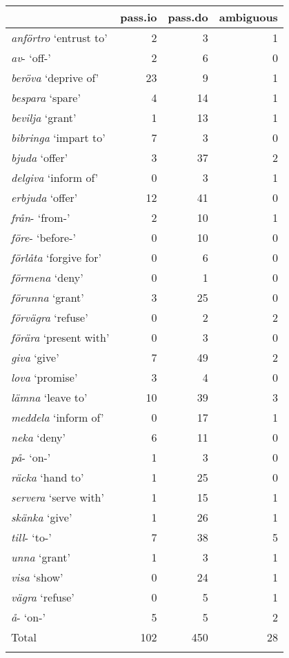 \documentclass[output=paper]{langscibook}
\begin{document}
\label{falk:appendix:3}
\begin{table}[H]
\begin{tabular}{l rrr}
\lsptoprule
& pass.io & pass.do & ambiguous\\\midrule
\textit{anförtro} ‘entrust to’ &  2 & 3  & 1\\
\textit{av}{}- ‘off-’          &  2 & 6  & 0\\
\textit{beröva} ‘deprive of’   & 23 & 9  & 1\\
\textit{bespara} ‘spare’       &  4 & 14 & 1\\
\textit{bevilja} ‘grant’       &  1 & 13 & 1\\
\textit{bibringa} ‘impart to’  &  7 & 3  & 0\\
\textit{bjuda} ‘offer’         &  3 & 37 & 2\\
\textit{delgiva} ‘inform of’   &  0 &  3 & 1\\
\textit{erbjuda} ‘offer’       & 12 & 41 & 0\\
\textit{från}{}- ‘from-’       &  2 & 10 & 1\\
\textit{före}{}- ‘before-’     &  0 & 10 & 0\\
\textit{förlåta} ‘forgive for’ &  0 &  6 & 0\\
\textit{förmena} ‘deny’        &  0 &  1 & 0\\
\textit{förunna} ‘grant’       &  3 & 25 & 0\\
\textit{förvägra} ‘refuse’     &  0 &  2 & 2\\
\textit{förära} ‘present with’ &  0 &  3 & 0\\
\textit{giva} ‘give’           &  7 & 49 & 2\\
\textit{lova} ‘promise’        &  3 &  4 & 0\\
\textit{lämna} ‘leave to’      & 10 & 39 & 3\\
\textit{meddela} ‘inform of’   &  0 & 17 & 1\\
\textit{neka} ‘deny’           &  6 & 11 & 0\\
\textit{på}{}- ‘on-’           &  1 &  3 & 0\\
\textit{räcka} ‘hand to’       &  1 & 25 & 0\\
\textit{servera} ‘serve with’  &  1 & 15 & 1\\
\textit{skänka} ‘give’         &  1 & 26 & 1\\
\textit{till}{}- ‘to-’         &  7 & 38 & 5\\
\textit{unna} ‘grant’          &  1 &  3 & 1\\
\textit{visa} ‘show’           &  0 & 24 & 1\\
\textit{vägra} ‘refuse’        &  0 &  5 & 1\\
\textit{å}{}- ‘on-’            &  5 &  5 & 2\\
Total & 102 & 450 & 28\\\lspbottomrule
\end{tabular}
\end{table}

{\sloppy\printbibliography[heading=subbibliography,notkeyword=this]}
\end{document}
